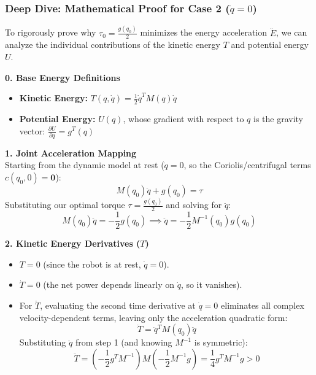 \documentclass[11pt,a4paper]{article}
\begin{document}
\subsubsection*{Deep Dive: Mathematical Proof for Case 2 ($\dot{q} = 0$)}
To rigorously prove why $\tau_0 = \frac{g(q_0)}{2}$ minimizes the energy acceleration $\ddot{E}$, we can analyze the individual contributions of the kinetic energy $T$ and potential energy $U$.

\textbf{0. Base Energy Definitions}
\begin{itemize}
    \item \textbf{Kinetic Energy:} $T(q, \dot{q}) = \frac{1}{2} \dot{q}^T M(q) \dot{q}$
    \item \textbf{Potential Energy:} $U(q)$, whose gradient with respect to $q$ is the gravity vector: $\frac{\partial U}{\partial q} = g^T(q)$
\end{itemize}

\textbf{1. Joint Acceleration Mapping} \\
Starting from the dynamic model at rest ($\dot{q} = 0$, so the Coriolis/centrifugal terms $c(q_0, 0) = \mathbf{0}$):
\begin{equation}
    M(q_0)\ddot{q} + g(q_0) = \tau
\end{equation}
Substituting our optimal torque $\tau = \frac{g(q_0)}{2}$ and solving for $\ddot{q}$:
\begin{equation}
    M(q_0)\ddot{q} = -\frac{1}{2}g(q_0) \implies \ddot{q} = -\frac{1}{2}M^{-1}(q_0)g(q_0)
\end{equation}

\textbf{2. Kinetic Energy Derivatives ($T$)}
\begin{itemize}
    \item $T = 0$ (since the robot is at rest, $\dot{q} = 0$).
    \item $\dot{T} = 0$ (the net power depends linearly on $\dot{q}$, so it vanishes).
    \item For $\ddot{T}$, evaluating the second time derivative at $\dot{q} = 0$ eliminates all complex velocity-dependent terms, leaving only the acceleration quadratic form:
    \begin{equation}
        \ddot{T} = \ddot{q}^T M(q_0) \ddot{q}
    \end{equation}
    Substituting $\ddot{q}$ from step 1 (and knowing $M^{-1}$ is symmetric):
    \begin{equation}
        \ddot{T} = \left(-\frac{1}{2}g^T M^{-1}\right) M \left(-\frac{1}{2}M^{-1}g\right) = \frac{1}{4}g^T M^{-1} g > 0
    \end{equation}
\end{itemize}
\end{document}
